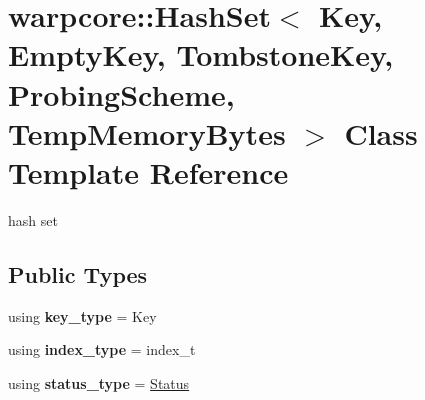 \hypertarget{classwarpcore_1_1HashSet}{}\section{warpcore\+:\+:Hash\+Set$<$ Key, Empty\+Key, Tombstone\+Key, Probing\+Scheme, Temp\+Memory\+Bytes $>$ Class Template Reference}
\label{classwarpcore_1_1HashSet}


hash set  


\subsection*{Public Types}
\begin{DoxyCompactItemize}
\item 
\mbox{\label{classwarpcore_1_1HashSet_a63b9dab14e325289f3291c9c70acb61f}} 
using {\bfseries key\+\_\+type} = Key
\item 
\mbox{\label{classwarpcore_1_1HashSet_a676d14c28ab3a6c6c80c2a626d168930}} 
using {\bfseries index\+\_\+type} = index\+\_\+t
\item 
\mbox{\label{classwarpcore_1_1HashSet_a0bb489daa2ebec41b5e7df445cb55a51}} 
using {\bfseries status\+\_\+type} = \hyperlink{classwarpcore_1_1Status}{Status}
\end{DoxyCompactItemize}
